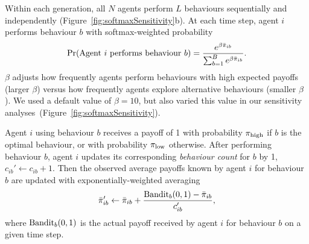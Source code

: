 \documentclass[letterpaper,11.5pt]{scrartcl}
\begin{document}
Within each generation, all $N$ agents perform $L$ behaviours sequentially and
independently (Figure~\ref{fig:softmaxSensitivity}b).
At each time step, agent $i$ performs behaviour $b$ with softmax-weighted probability
\begin{equation}
  \Pr(\text{Agent $i$ performs behaviour $b$}) = 
    \frac{e^{\beta \bar\pi_{ib}}}{\sum_{b=1}^B e^{\beta \bar\pi_{ib}}}.
\end{equation}
\noindent
$\beta$ adjusts how frequently agents perform 
behaviours with high expected payoffs (larger $\beta$) versus how frequently
agents explore alternative behaviours (smaller $\beta$). %
We used a default value of $\beta = 10$, but also varied this value in our
sensitivity analyses~(Figure~\ref{fig:softmaxSensitivity}). 

Agent $i$ using behaviour $b$ receives a payoff of 1 with probability $\pi_{\mathrm{high}}$
if $b$ is the optimal behaviour, or with probability $\pi_{\mathrm{low}}$ otherwise. 
After performing behaviour $b$, agent $i$ updates its
corresponding \emph{behaviour count} for $b$ by 1, $c_{ib}' \leftarrow c_{ib} + 1$.
Then the observed average payoffs known by agent $i$ for behaviour $b$ are updated with
exponentially-weighted averaging
\begin{equation}
  \bar\pi_{ib}' \leftarrow \bar\pi_{ib} + \frac{\text{Bandit}_b(0, 1) - \bar\pi_{ib}}{c_{ib}'},
\end{equation}
\noindent
where $\text{Bandit}_b(0, 1)$ is the actual payoff received by agent $i$ for behaviour $b$ on a
given %
time step. 
\end{document}
